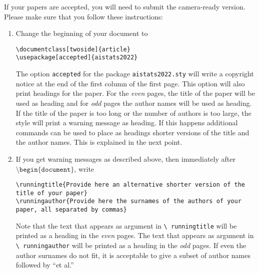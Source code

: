 \documentclass[twoside]{article}
\begin{document}

If your papers are accepted, you will need to submit the camera-ready version. Please make sure that you follow these instructions:
\begin{enumerate}
    \item Change the beginning of your document to
    \begin{flushleft}
    \texttt{\textbackslash documentclass[twoside]\{article\}}\\
    \texttt{\textbackslash usepackage[accepted]\{aistats2022\}}
    \end{flushleft}
    The option \texttt{accepted} for the package
    \texttt{aistats2022.sty} will write a copyright notice at the end of
    the first column of the first page. This option will also print
    headings for the paper.  For the \emph{even} pages, the title of
    the paper will be used as heading and for \emph{odd} pages the
    author names will be used as heading.  If the title of the paper
    is too long or the number of authors is too large, the style will
    print a warning message as heading. If this happens additional
    commands can be used to place as headings shorter versions of the
    title and the author names. This is explained in the next point.
    \item  If you get warning messages as described above, then
    immediately after $\texttt{\textbackslash
    begin\{document\}}$, write
    \begin{flushleft}
    \texttt{\textbackslash runningtitle\{Provide here an alternative
    shorter version of the title of your paper\}}\\
    \texttt{\textbackslash runningauthor\{Provide here the surnames of
    the authors of your paper, all separated by commas\}}
    \end{flushleft}
    Note that the text that appears as argument in \texttt{\textbackslash
      runningtitle} will be printed as a heading in the \emph{even}
    pages. The text that appears as argument in \texttt{\textbackslash
      runningauthor} will be printed as a heading in the \emph{odd}
    pages.  If even the author surnames do not fit, it is acceptable
    to give a subset of author names followed by ``et al.''


\end{enumerate}
\end{document}
